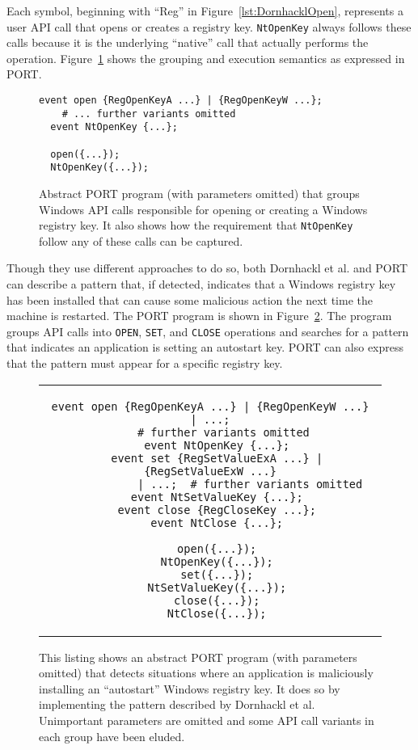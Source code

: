Each symbol, beginning with ``Reg'' in Figure~\ref{lst:DornhacklOpen}, represents a user
API call that opens or creates a registry key.  {\tt NtOpenKey} always follows
these calls because it is the underlying ``native'' call that actually performs the operation.
Figure~\ref{lst:PORTOpenReg} shows the grouping and execution semantics as expressed
in PORT.

\begin{figure}[t]
\begin{lstlisting}[gobble=2]
  event open {RegOpenKeyA ...} | {RegOpenKeyW ...};
    # ... further variants omitted
  event NtOpenKey {...};

  open({...});
  NtOpenKey({...});
\end{lstlisting}
  \caption{Abstract PORT program (with parameters
  omitted) that groups Windows API calls responsible for opening or
  creating a Windows registry key.  It also shows
  how the requirement that \lstinline+NtOpenKey+ follow any of these calls can be
  captured.}
\label{lst:PORTOpenReg}
\end{figure}

Though they use different approaches to do so,  both Dornhackl et al. and PORT can describe a pattern that, if
detected, indicates that
a Windows registry key has been installed
that can cause some malicious action
the next time the machine is restarted.
The PORT program is shown in Figure~\ref{lst:PORTRegDetect}.  The program groups API calls into \lstinline+OPEN+, \lstinline+SET+, and \lstinline+CLOSE+ operations and searches for a pattern that
indicates
an application is
setting an autostart key.  PORT can also express
that the pattern must appear for a specific registry key.

\begin{figure}[t]
\centering
\begin{tabular}{c}
\begin{lstlisting}[gobble=2]
  event open {RegOpenKeyA ...} | {RegOpenKeyW ...} | ...;
    # further variants omitted
  event NtOpenKey {...};
  event set {RegSetValueExA ...} | {RegSetValueExW ...}
            | ...;  # further variants omitted
  event NtSetValueKey {...};
  event close {RegCloseKey ...};
  event NtClose {...};

  open({...});
  NtOpenKey({...});
  set({...});
  NtSetValueKey({...});
  close({...});
  NtClose({...});
\end{lstlisting}
\end{tabular}
  \caption{This listing shows an abstract PORT program (with parameters
  omitted) that detects situations where an application is maliciously
  installing an ``autostart'' Windows registry key.  It does so by
  implementing the pattern described by Dornhackl et al.  Unimportant
  parameters are omitted and some API call variants in each group have been
  eluded.}
\label{lst:PORTRegDetect}
\end{figure}


